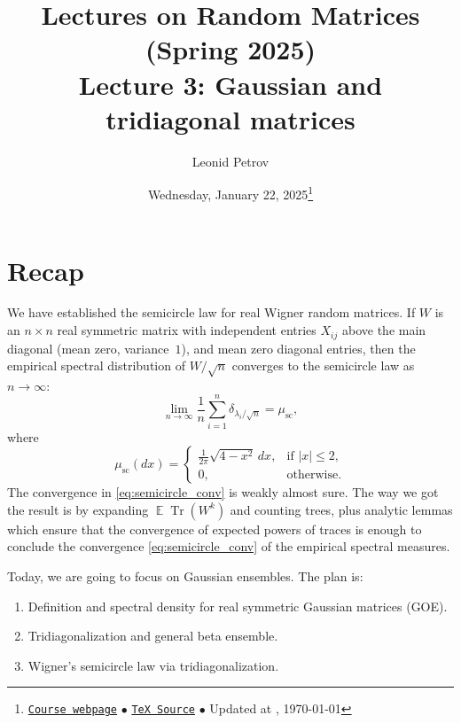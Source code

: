 \documentclass[letterpaper,11pt,oneside,reqno]{article}
\numberwithin{equation}{section}
\theoremstyle{definition}
\begin{document}
\title{Lectures on Random Matrices
(Spring 2025)
\\Lecture 3: Gaussian and tridiagonal matrices}


\date{Wednesday, January 22, 2025\footnote{\href{https://lpetrov.cc/rmt25/}{\texttt{Course webpage}}
$\bullet$ \href{https://lpetrov.cc/rmt25/rmt25-notes/rmt2025-l03.tex}{\texttt{TeX Source}}
$\bullet$
Updated at \currenttime, \today}}

\author{Leonid Petrov}


\maketitle


\tableofcontents




\section{Recap}

We have established the semicircle law for
real Wigner random matrices.
If $W$ is an $n\times n$ real symmetric matrix with
independent entries $X_{ij}$ above the main diagonal
(mean zero, variance~$1$), and mean zero diagonal entries,
then the empirical spectral distribution of $W/\sqrt{n}$
converges to the semicircle law as $n\to\infty$:
\begin{equation}
	\label{eq:semicircle_conv}
	\lim_{n\to\infty} \frac{1}{n} \sum_{i=1}^n \delta_{\lambda_i/\sqrt n} =
	\mu_{\mathrm{sc}},
\end{equation}
where
\begin{equation*}
	\mu_{\mathrm{sc}}(dx) = \begin{cases}
		\frac{1}{2\pi} \sqrt{4-x^2} \, dx, & \text{if } |x|\le 2, \\
		0, & \text{otherwise}.
	\end{cases}
\end{equation*}
The convergence
in \eqref{eq:semicircle_conv} is weakly almost sure.
The way we got the result is by expanding
$\operatorname{\mathbb{E}}\operatorname{Tr} (W^k)$ and counting
trees, plus analytic lemmas which ensure that
the convergence of expected powers of traces is enough
to conclude the convergence
\eqref{eq:semicircle_conv}
of the empirical spectral measures.

\medskip

Today, we are going to focus on Gaussian ensembles. The plan is:
\begin{enumerate}[$\bullet$]
	\item Definition and spectral density for real symmetric Gaussian matrices (GOE).
	\item Tridiagonalization and general beta ensemble.
	\item Wigner's semicircle law via tridiagonalization.
\end{enumerate}
\end{document}
